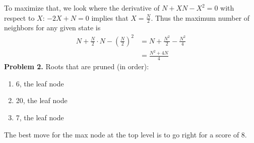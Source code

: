 \documentclass{article}
\begin{document}
To maximize that, we look where the derivative of $N+XN-X^2=0$ with respect to $X$: $-2X+N=0$ implies that $X=\frac{N}{2}$. Thus the maximum number of neighbors for any given state is 
\begin{align*}
	N + \frac{N}{2} \cdot N - (\frac{N}{2})^2 &= N+\frac{N^2}{2} - \frac{N^2}{4}\\
	&=\frac{N^2+4N}{4}
\end{align*}
\textbf{Problem 2.} Roots that are pruned (in order):
\begin{enumerate}
	\item 6, the leaf node
	\item 20, the leaf node
	\item 7, the leaf node
\end{enumerate}
The best move for the max node at the top level is to go right for a score of 8.
\end{document}
